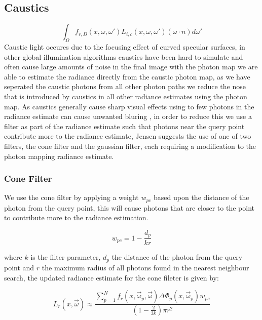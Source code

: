 \subsection{Caustics}
\begin{equation*}
		\int_{\Omega}
			f_{r,D}(x, \omega, \omega')
			L_{i,c}(x,\omega,\omega')
			(\omega \cdot n)d\omega'
\end{equation*}
Caustic light occures due to the focusing effect of curved specular surfaces, in other global illumination algorithms
caustics have been hard to simulate  and often cause large amounts of noise in the final image 
with the photon map we are able to estimate the radiance directly from the caustic photon map, as we have seperated the
caustic photons from all other photon paths we reduce the nose that is introduced by caustics in all other radiance
estimates using the photon map. As caustics generally cause sharp visual effects using to few photons in the radiance
estimate can cause unwanted bluring \cite{JensenBook}, in order to reduce this we use a filter as part of the radiance estimate such
that photons near the query point contribute more to the radiance estimate, Jensen suggests the use of one of two filters, the
cone filter and the gaussian filter, each requiring a modification to the photon mapping radiance estimate.

\subsubsection{Cone Filter}
We use the cone filter by applying a weight $w_{pc}$ based upon the distance of the photon from the query point, this will
cause photons that are closer to the point to contribute more to the radiance estimation.

\begin{equation}
w_{pc} = 1 - \frac{d_p}{k r}
\end{equation}

where $k$ is the filter parameter, $d_p$ the distance of the photon from the query point and $r$ the maximum radius of
all photons found in the nearest neighbour search, the updated radiance estimate for the cone fileter is given by:

\begin{equation}
L_r(x, \vec{\omega}) \approx
\frac
{\sum\limits_{p=1}^N f_r(x, \vec{\omega}_p,\vec{\omega})\Delta \Phi_p(x,\vec{\omega}_p)w_{pc}}
{(1 - \frac{2}{3k})\pi r ^2}
\end{equation}

